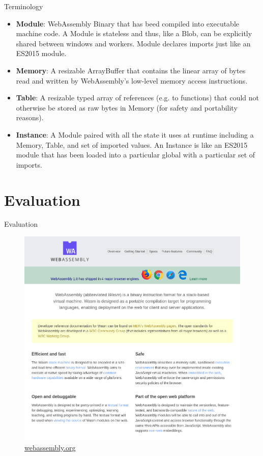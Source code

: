 \documentclass{beamer}
\begin{document}
\begin{frame}{Terminology}
    \begin{itemize}
        \item \textbf{Module}: WebAssembly Binary that has beed compiled into executable machine code. A Module is stateless and thus, like a Blob, can be explicitly shared between windows and workers. Module declares imports just like an ES2015 module.
        \item \textbf{Memory}: A resizable ArrayBuffer that contains the linear array of bytes read and written by WebAssembly’s low-level memory access instructions.
        \item \textbf{Table}: A resizable typed array of references (e.g. to functions) that could not otherwise be stored as raw bytes in Memory (for safety and portability reasons).
        \item \textbf{Instance}: A Module paired with all the state it uses at runtime including a Memory, Table, and set of imported values. An Instance is like an ES2015 module that has been loaded into a particular global with a particular set of imports.
    \end{itemize}
\end{frame}

\section{Evaluation}

\begin{frame}{Evaluation}
    \begin{figure}
        \includegraphics[scale=0.2]{./images/webassembly_org.png}
        \caption{\href{https://webassembly.org/}{webassembly.org}}
    \end{figure}
\end{frame}
\end{document}
